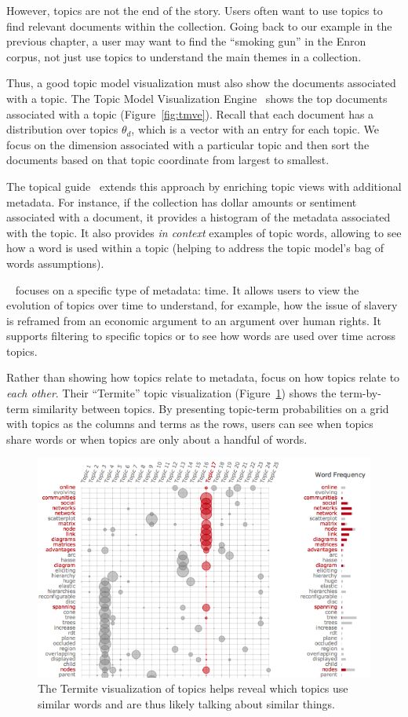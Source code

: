 However, topics are not the end of the story.  Users often want to use topics to
find relevant documents within the collection.  Going back to our example in the
previous chapter, a user may want to find the ``smoking gun'' in the Enron
corpus, not just use topics to understand the main themes in a collection.

Thus, a good topic model visualization must also show the documents associated
with a topic.  The Topic Model Visualization Engine~\citep{chaney-12} shows the
top documents associated with a topic (Figure~\ref{fig:tmve}).  Recall that each
document has a distribution over topics $\theta_d$, which is a vector with an
entry for each topic.  We focus on the dimension associated with a particular topic
and then sort the documents based on that topic coordinate from largest to
smallest.

The topical guide~\citep{gardner-10} extends this approach by enriching topic
views with additional metadata.  For instance, if the collection has dollar
amounts or sentiment~\citep{pang-08} associated with a document, it provides a
histogram of the metadata associated with the topic.  It also provides \emph{in
  context} examples of topic words, allowing to see how a word is used within a
topic (helping to address the topic model's bag of words assumptions).

~\citep{eistenstein-14} focuses on a specific type of metadata: time.
It allows users to view the evolution of topics over time to understand, for
example, how the issue of slavery is reframed from an economic argument to an
argument over human rights.  It supports filtering to specific topics or to see
how words are used over time across topics.

Rather than showing how topics relate to metadata,
\citet{chuang-12} focus on how topics relate to \emph{each other}.
Their ``Termite'' topic visualization (Figure~\ref{fig:termite}) shows
the term-by-term similarity between topics.  By presenting topic-term
probabilities on a grid with topics as the columns and terms as the
rows, users can see when topics share words or when topics are only
about a handful of words.

\begin{figure}
  \includegraphics[width=.9\linewidth]{figures/viz_termite}
  \caption{The Termite visualization of topics helps reveal which
    topics use similar words and are thus likely talking about similar
    things.}
  \label{fig:termite}
\end{figure}

